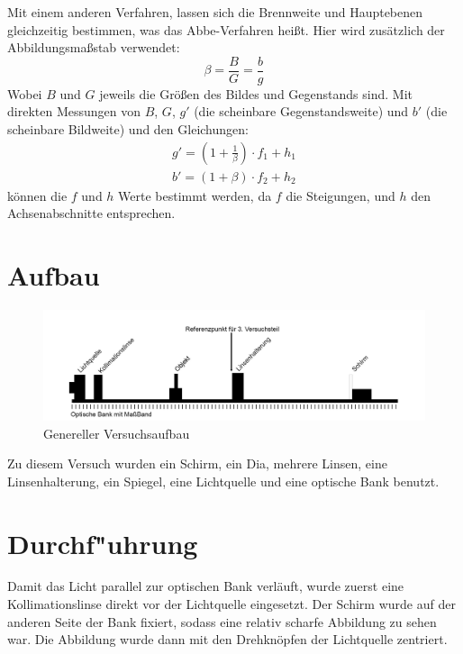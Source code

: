 \documentclass[11pt,a4paper]{article}
\begin{document}
Mit einem anderen Verfahren, lassen sich die Brennweite und Hauptebenen gleichzeitig bestimmen, was das Abbe-Verfahren heißt. Hier wird zusätzlich der Abbildungsmaßstab verwendet: 
$$ \beta = \frac{B}{G} = \frac{b}{g}$$
Wobei $B$ und $G$ jeweils die Größen des Bildes und Gegenstands sind. 
Mit direkten Messungen von $B$, $G$, $g'$ (die scheinbare Gegenstandsweite) und $b'$ (die scheinbare Bildweite) und den Gleichungen:
\begin{equation}
\begin{array}{l}
	g' = (1+\frac{1}{\beta})\cdot f_1 + h_1 \\
	b' = (1+\beta)\cdot f_2 + h_2
\end{array}
\end{equation}
können die $f$ und $h$ Werte bestimmt werden, da $f$ die Steigungen, und $h$ den Achsenabschnitte entsprechen. 



\section{Aufbau}
\begin{figure}[h]
	\centering
	\includegraphics[width=\linewidth]{Aufbau}
	\caption{Genereller Versuchsaufbau}
\end{figure}
Zu diesem Versuch wurden ein Schirm, ein Dia, mehrere Linsen, eine Linsenhalterung, ein Spiegel, eine Lichtquelle und eine optische Bank benutzt. 

\section{Durchf"uhrung}
Damit das Licht parallel zur optischen Bank verläuft, wurde zuerst eine Kollimationslinse direkt vor der Lichtquelle eingesetzt. Der Schirm wurde auf der anderen Seite der Bank fixiert, sodass eine relativ scharfe Abbildung zu sehen war. Die Abbildung wurde dann mit den Drehknöpfen der Lichtquelle zentriert. 
\end{document}
